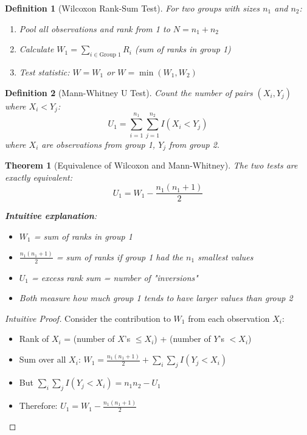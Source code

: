 \documentclass{article}
\newtheorem{definition}{Definition}
\newtheorem{theorem}{Theorem}
\begin{document}
\begin{definition}[Wilcoxon Rank-Sum Test]
For two groups with sizes $n_1$ and $n_2$:
\begin{enumerate}
    \item Pool all observations and rank from 1 to $N = n_1 + n_2$
    \item Calculate $W_1 = \sum_{i \in \text{Group 1}} R_i$ (sum of ranks in group 1)
    \item Test statistic: $W = W_1$ or $W = \min(W_1, W_2)$
\end{enumerate}
\end{definition}

\begin{definition}[Mann-Whitney U Test]
Count the number of pairs $(X_i, Y_j)$ where $X_i < Y_j$:
\begin{equation}
U_1 = \sum_{i=1}^{n_1} \sum_{j=1}^{n_2} I(X_i < Y_j)
\end{equation}
where $X_i$ are observations from group 1, $Y_j$ from group 2.
\end{definition}

\begin{theorem}[Equivalence of Wilcoxon and Mann-Whitney]
The two tests are exactly equivalent:
\begin{equation}
U_1 = W_1 - \frac{n_1(n_1+1)}{2}
\end{equation}

\textbf{Intuitive explanation}:
\begin{itemize}
    \item $W_1$ = sum of ranks in group 1
    \item $\frac{n_1(n_1+1)}{2}$ = sum of ranks if group 1 had the $n_1$ smallest values
    \item $U_1$ = excess rank sum = number of "inversions"
    \item Both measure how much group 1 tends to have larger values than group 2
\end{itemize}
\end{theorem}

\begin{proof}[Intuitive Proof]
Consider the contribution to $W_1$ from each observation $X_i$:
\begin{itemize}
    \item Rank of $X_i$ = (number of $X$'s $\leq X_i$) + (number of $Y$'s $< X_i$)
    \item Sum over all $X_i$: $W_1 = \frac{n_1(n_1+1)}{2} + \sum_i \sum_j I(Y_j < X_i)$
    \item But $\sum_i \sum_j I(Y_j < X_i) = n_1 n_2 - U_1$
    \item Therefore: $U_1 = W_1 - \frac{n_1(n_1+1)}{2}$
\end{itemize}
\end{proof}
\end{document}
